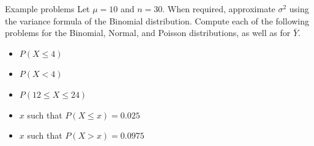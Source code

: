 \documentclass[
  ignorenonframetext,
]{beamer}
\providecommand{\tightlist}{%
  \setlength{\itemsep}{0pt}\setlength{\parskip}{0pt}}
\begin{document}
\begin{frame}{Example problems}
\protect{}\label{example-problems}
Let \(\mu=10\) and \(n=30\). When required, approximate \(\sigma^2\)
using the variance formula of the Binomial distribution. Compute each of
the following problems for the Binomial, Normal, and Poisson
distributions, as well as for \(\bar{Y}\).

\begin{itemize}
\tightlist
\item
  \(P(X\leq 4)\)
\item
  \(P(X\lt 4)\)
\item
  \(P(12\leq X \leq 24)\)
\item
  \(x\) such that \(P(X\leq x)=0.025\)
\item
  \(x\) such that \(P(X>x)=0.0975\)
\end{itemize}
\end{frame}
\end{document}
